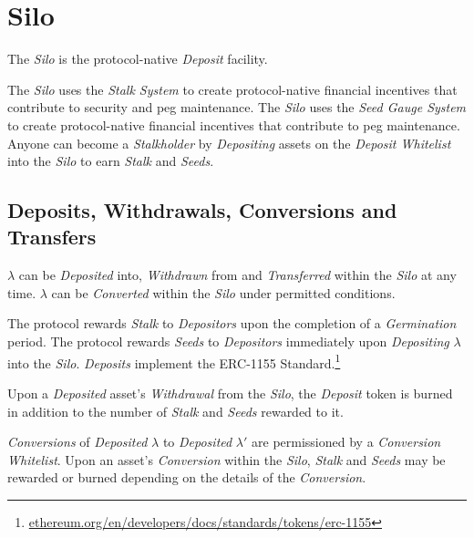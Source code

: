 \documentclass[tikz]{article}
\newcommand{\term}[1]{\textsl{#1}}
\newcommand{\fref}[1]{\footnote{\href{http://#1}{#1}}}
\begin{document}
\vspace*{-1mm}
\section{Silo}
\vspace*{-1mm}

The \term{Silo} is the protocol-native \term{Deposit} facility.

The \term{Silo} uses the \term{Stalk System} to create protocol-native financial incentives that contribute to security and peg maintenance. The \term{Silo} uses the \term{Seed Gauge System} to create protocol-native financial incentives that contribute to peg maintenance. Anyone can become a \term{Stalkholder} by \term{Depositing} assets on the \term{Deposit Whitelist} into the \term{Silo} to earn \term{Stalk} and \term{Seeds}.


\vspace*{-1.2mm}
\subsection{Deposits, Withdrawals, Conversions and Transfers}
\vspace*{-1.2mm}

$\lambda$ can be \term{Deposited} into, \term{Withdrawn} from and \term{Transferred} within the \term{Silo} at any time. $\lambda$ can be \term{Converted} within the \term{Silo} under permitted conditions. 

The protocol rewards \term{Stalk} to \term{Depositors} upon the completion of a \term{Germination} period. The protocol rewards \term{Seeds} to \term{Depositors} immediately upon \term{Depositing} $\lambda$ into the \term{Silo}. \term{Deposits} implement the ERC-1155 Standard.\fref{ethereum.org/en/developers/docs/standards/tokens/erc-1155}

Upon a \term{Deposited} asset's \term{Withdrawal} from the \term{Silo}, the \term{Deposit} token is burned in addition to the number of \term{Stalk} and \term{Seeds} rewarded to it. 

\vspace*{1.2mm}

\term{Conversions} of \term{Deposited} $\lambda$ to \term{Deposited} $\lambda'$ are permissioned by a \term{Conversion Whitelist}. Upon an asset's \term{Conversion} within the \term{Silo}, \term{Stalk} and \term{Seeds} may be rewarded or burned depending on the details of the \term{Conversion}.
\end{document}
